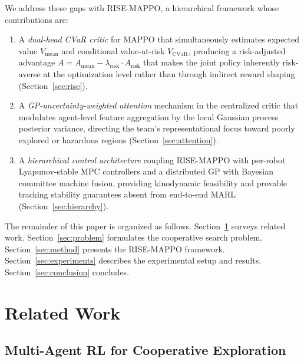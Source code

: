 \documentclass[letterpaper]{IEEEtran}
\newcommand{\vmean}{V_{\text{mean}}}
\newcommand{\vcvar}{V_{\text{CVaR}}}
\newcommand{\amean}{A_{\text{mean}}}
\newcommand{\arisk}{A_{\text{risk}}}
\newcommand{\lrisk}{\lambda_{\text{risk}}}
\begin{document}
We address these gaps with RISE-MAPPO, a hierarchical framework whose contributions are:
\begin{enumerate}
    \item A \emph{dual-head CVaR critic} for MAPPO that simultaneously estimates expected value $\vmean$ and conditional value-at-risk $\vcvar$, producing a risk-adjusted advantage $A = \amean - \lrisk \cdot \arisk$ that makes the joint policy inherently risk-averse at the optimization level rather than through indirect reward shaping (Section~\ref{sec:rise}).
    \item A \emph{GP-uncertainty-weighted attention} mechanism in the centralized critic that modulates agent-level feature aggregation by the local Gaussian process posterior variance, directing the team's representational focus toward poorly explored or hazardous regions (Section~\ref{sec:attention}).
    \item A \emph{hierarchical control architecture} coupling RISE-MAPPO with per-robot Lyapunov-stable MPC controllers and a distributed GP with Bayesian committee machine fusion, providing kinodynamic feasibility and provable tracking stability guarantees absent from end-to-end MARL (Section~\ref{sec:hierarchy}).
\end{enumerate}

The remainder of this paper is organized as follows. Section~\ref{sec:related} surveys related work. Section~\ref{sec:problem} formulates the cooperative search problem. Section~\ref{sec:method} presents the RISE-MAPPO framework. Section~\ref{sec:experiments} describes the experimental setup and results. Section~\ref{sec:conclusion} concludes.

\section{Related Work}
\label{sec:related}

\subsection{Multi-Agent RL for Cooperative Exploration}
\end{document}
